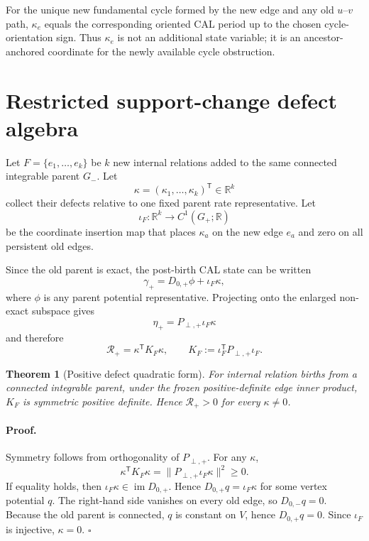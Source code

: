 \documentclass[aip,jmp,amsmath,amssymb,reprint]{revtex4-2}
\newtheorem{theorem}{Theorem}
\newcommand{\Rcal}{\mathcal{R}}
\newcommand{\imop}{\operatorname{im}}
\begin{document}
For the unique new fundamental cycle formed by the new edge and any old $u$--$v$ path, $\kappa_e$ equals the corresponding oriented CAL period up to the chosen cycle-orientation sign. Thus $\kappa_e$ is not an additional state variable; it is an ancestor-anchored coordinate for the newly available cycle obstruction.

\section{Restricted support-change defect algebra}\label{sec:defect}

Let $F=\{e_1,\ldots,e_k\}$ be $k$ new internal relations added to the same connected integrable parent $G_-$. Let
\begin{equation}
\kappa=(\kappa_1,\ldots,\kappa_k)^{\mathsf T}\in\mathbb R^k
\end{equation}
collect their defects relative to one fixed parent rate representative. Let
\begin{equation}
\iota_F:\mathbb R^k\longrightarrow C^1(G_+;\mathbb R)
\label{eq:defect-insertion-map}
\end{equation}
be the coordinate insertion map that places $\kappa_a$ on the new edge $e_a$ and zero on all persistent old edges.

Since the old parent is exact, the post-birth CAL state can be written
\begin{equation}
\gamma_+=D_{0,+}\phi+\iota_F\kappa,
\label{eq:birth-decomposition}
\end{equation}
where $\phi$ is any parent potential representative. Projecting onto the enlarged non-exact subspace gives
\begin{equation}
\boxed{
\eta_+=P_{\perp,+}\iota_F\kappa
}
\label{eq:eta-after-birth}
\end{equation}
and therefore
\begin{equation}
\boxed{
\Rcal_+
=\kappa^{\mathsf T}K_F\kappa,
\qquad
K_F:=\iota_F^{\mathsf T}P_{\perp,+}\iota_F.
}
\label{eq:quadratic-kappa}
\end{equation}

\begin{theorem}[Positive defect quadratic form]\label{thm:K-positive}
For internal relation births from a connected integrable parent, under the frozen positive-definite edge inner product, $K_F$ is symmetric positive definite. Hence $\Rcal_+>0$ for every $\kappa\neq0$.
\end{theorem}

\paragraph*{Proof.}
Symmetry follows from orthogonality of $P_{\perp,+}$. For any $\kappa$,
\begin{equation}
\kappa^{\mathsf T}K_F\kappa
=\|P_{\perp,+}\iota_F\kappa\|^2\ge0.
\end{equation}
If equality holds, then $\iota_F\kappa\in\imop D_{0,+}$. Hence $D_{0,+}q=\iota_F\kappa$ for some vertex potential $q$. The right-hand side vanishes on every old edge, so $D_{0,-}q=0$. Because the old parent is connected, $q$ is constant on $V$, hence $D_{0,+}q=0$. Since $\iota_F$ is injective, $\kappa=0$. \hfill$\square$
\end{document}
